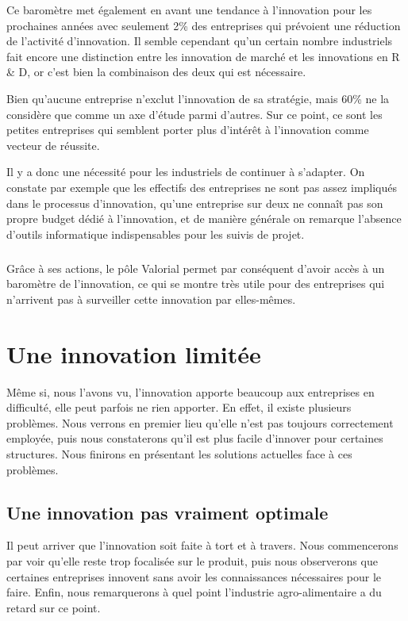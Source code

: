 \documentclass[a4paper,12pt]{report}
\begin{document}
    Ce baromètre met également en avant une tendance à l’innovation pour les prochaines années avec seulement 2\% des entreprises qui prévoient une réduction de l’activité d’innovation. Il semble cependant qu’un certain nombre industriels fait encore une distinction entre les innovation de marché et les innovations en R \& D, or c’est bien la combinaison des deux qui est nécessaire.

    Bien qu’aucune entreprise n’exclut l’innovation de sa stratégie, mais 60\% ne la considère que comme un axe d’étude parmi d’autres. Sur ce point, ce sont les petites entreprises qui semblent porter plus d’intérêt à l’innovation comme vecteur de réussite.

    Il y a donc une nécessité pour les industriels de continuer à s’adapter. On constate par exemple que les effectifs des entreprises ne sont pas assez impliqués dans le processus d’innovation, qu’une entreprise sur deux ne connaît pas son propre budget dédié à l’innovation, et de manière générale on remarque l’absence d’outils informatique indispensables pour les suivis de projet.
    
    \paragraph{}Grâce à ses actions, le pôle Valorial permet par conséquent d'avoir accès à un baromètre de l'innovation, ce qui se montre très utile pour des entreprises qui n'arrivent pas à surveiller cette innovation par elles-mêmes.

\chapter{Une innovation limitée}
	Même si, nous l'avons vu, l'innovation apporte beaucoup aux entreprises en difficulté, elle peut parfois ne rien apporter. En effet, il existe plusieurs problèmes. Nous verrons en premier lieu qu'elle n'est pas toujours correctement employée, puis nous constaterons qu'il est plus facile d'innover pour certaines structures. Nous finirons en présentant les solutions actuelles face à ces problèmes.

	\section{Une innovation pas vraiment optimale}
	Il peut arriver que l'innovation soit faite à tort et à travers. Nous commencerons par voir qu'elle reste trop focalisée sur le produit, puis nous observerons que certaines entreprises innovent sans avoir les connaissances nécessaires pour le faire. Enfin, nous remarquerons à quel point l'industrie agro-alimentaire a du retard sur ce point.
	
\end{document}
